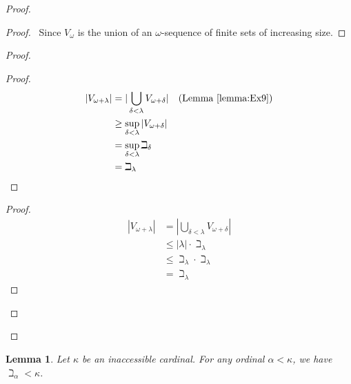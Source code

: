 \documentclass{report}
\let\qed\relax
\newtheorem{lemma}[axiom]{Lemma}
\theoremstyle{definition}
\begin{document}
    \begin{proof}
        \pf
        \begin{proof}
            \pf\ Since $V_\omega$ is the union of an $\omega$-sequence of finite sets of increasing size.
        \end{proof}
        \begin{proof}
            \begin{proof}
                \pf
                \begin{align*}
                    |V_{\omega + \lambda}| & = |\bigcup_{\delta < \lambda} V_{\omega + \delta}| &
                    (\text{Lemma \ref{lemma:Ex9}}) \\
                    & \geq \sup_{\delta < \lambda} |V_{\omega + \delta}| \\
                    & = \sup_{\delta < \lambda} \beth_\delta \\
                    & = \beth_\lambda
                \end{align*}
            \end{proof}
            \begin{proof}
                \pf
                \begin{align*}
                    |V_{\omega + \lambda}| & = |\bigcup_{\delta < \lambda} V_{\omega + \delta}| \\
                    & \leq |\lambda| \cdot \beth_\lambda \\
                    & \leq \beth_\lambda \cdot \beth_\lambda \\
                    & = \beth_\lambda
                \end{align*}
            \end{proof}
        \end{proof}
        \qed
    \end{proof}

    \begin{lemma}
        Let $\kappa$ be an inaccessible cardinal. For any ordinal $\alpha < \kappa$, we have
        $\beth_\alpha < \kappa$.
    \end{lemma}
\end{document}
